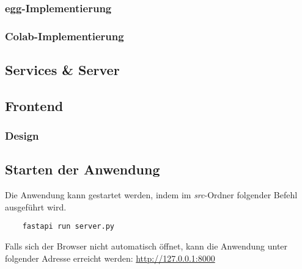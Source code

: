 \subsubsection{egg-Implementierung}

\subsubsection{Colab-Implementierung}

\subsection{Services \& Server}

\subsection{Frontend}

\subsubsection{Design}

\subsection{Starten der Anwendung}

Die Anwendung kann gestartet werden, indem im \textit{src}-Ordner folgender Befehl ausgeführt wird. 

\begin{verbatim}
    fastapi run server.py
\end{verbatim}

Falls sich der Browser nicht automatisch öffnet, kann die Anwendung unter folgender Adresse erreicht werden:
\url{http://127.0.0.1:8000}